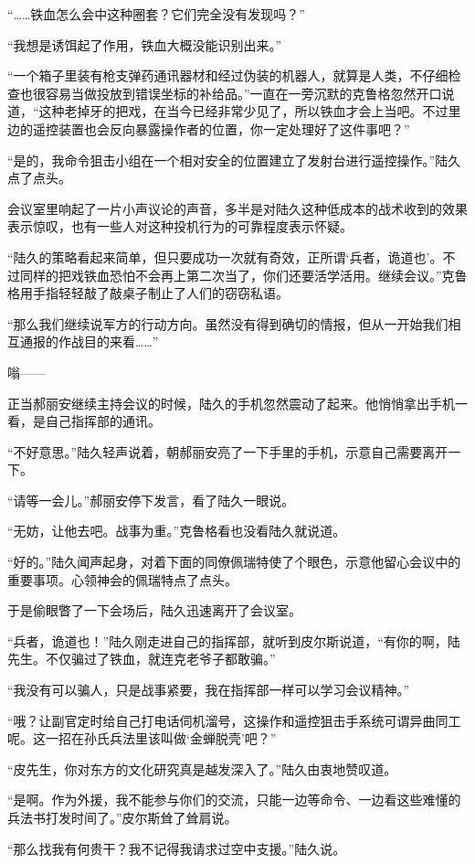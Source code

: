 “……铁血怎么会中这种圈套？它们完全没有发现吗？”

“我想是诱饵起了作用，铁血大概没能识别出来。”

“一个箱子里装有枪支弹药通讯器材和经过伪装的机器人，就算是人类，不仔细检查也很容易当做投放到错误坐标的补给品。”一直在一旁沉默的克鲁格忽然开口说道，“这种老掉牙的把戏，在当今已经非常少见了，所以铁血才会上当吧。不过里边的遥控装置也会反向暴露操作者的位置，你一定处理好了这件事吧？”

“是的，我命令狙击小组在一个相对安全的位置建立了发射台进行遥控操作。”陆久点了点头。

会议室里响起了一片小声议论的声音，多半是对陆久这种低成本的战术收到的效果表示惊叹，也有一些人对这种投机行为的可靠程度表示怀疑。

“陆久的策略看起来简单，但只要成功一次就有奇效，正所谓‘兵者，诡道也’。不过同样的把戏铁血恐怕不会再上第二次当了，你们还要活学活用。继续会议。”克鲁格用手指轻轻敲了敲桌子制止了人们的窃窃私语。

“那么我们继续说军方的行动方向。虽然没有得到确切的情报，但从一开始我们相互通报的作战目的来看……”

嗡——

正当郝丽安继续主持会议的时候，陆久的手机忽然震动了起来。他悄悄拿出手机一看，是自己指挥部的通讯。

“不好意思。”陆久轻声说着，朝郝丽安亮了一下手里的手机，示意自己需要离开一下。

“请等一会儿。”郝丽安停下发言，看了陆久一眼说。

“无妨，让他去吧。战事为重。”克鲁格看也没看陆久就说道。

“好的。”陆久闻声起身，对着下面的同僚佩瑞特使了个眼色，示意他留心会议中的重要事项。心领神会的佩瑞特点了点头。

于是偷眼瞥了一下会场后，陆久迅速离开了会议室。

“兵者，诡道也！”陆久刚走进自己的指挥部，就听到皮尔斯说道，“有你的啊，陆先生。不仅骗过了铁血，就连克老爷子都敢骗。”

“我没有可以骗人，只是战事紧要，我在指挥部一样可以学习会议精神。”

“哦？让副官定时给自己打电话伺机溜号，这操作和遥控狙击手系统可谓异曲同工呢。这一招在孙氏兵法里该叫做‘金蝉脱壳’吧？”

“皮先生，你对东方的文化研究真是越发深入了。”陆久由衷地赞叹道。

“是啊。作为外援，我不能参与你们的交流，只能一边等命令、一边看这些难懂的兵法书打发时间了。”皮尔斯耸了耸肩说。

“那么找我有何贵干？我不记得我请求过空中支援。”陆久说。


